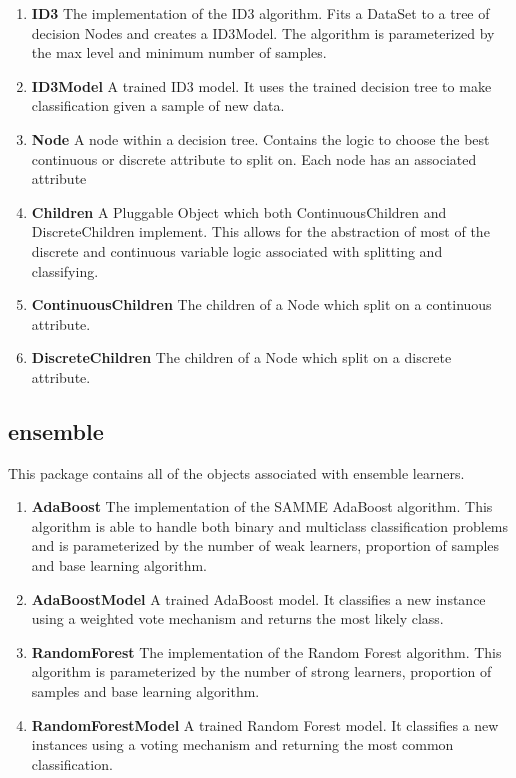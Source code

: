 \documentclass[11pt]{article}
\newcommand{\bb}{\textbf}
\begin{document}
\begin{enumerate}[leftmargin=*]
  \item[] \bb{ID3} The implementation of the ID3 algorithm. Fits a DataSet to a tree of decision Nodes and creates a ID3Model. The algorithm is parameterized by the max level and minimum number of samples.
  \item[] \bb{ID3Model} A trained ID3 model. It uses the trained decision tree to make classification given a sample of new data.
  \item[] \bb{Node} A node within a decision tree. Contains the logic to choose the best continuous or discrete attribute to split on. Each node has an associated attribute
  \item[] \bb{Children} A Pluggable Object which both ContinuousChildren and DiscreteChildren implement. This allows for the abstraction of most of the discrete and continuous variable logic associated with splitting and classifying.
  \item[] \bb{ContinuousChildren} The children of a Node which split on a continuous attribute.
  \item[] \bb{DiscreteChildren} The children of a Node which split on a discrete attribute.
\end{enumerate}

\subsection{ensemble}
This package contains all of the objects associated with ensemble learners.

\begin{enumerate}[leftmargin=*]
  \item[] \bb{AdaBoost} The implementation of the SAMME AdaBoost algorithm. This algorithm is able to handle both binary and multiclass classification problems and is parameterized by the number of weak learners, proportion of samples and base learning algorithm.
  \item[] \bb{AdaBoostModel} A trained AdaBoost model. It classifies a new instance using a weighted vote mechanism and returns the most likely class.
  \item[] \bb{RandomForest} The implementation of the Random Forest algorithm. This algorithm is parameterized by the number of strong learners, proportion of samples and base learning algorithm.
  \item[] \bb{RandomForestModel} A trained Random Forest model. It classifies a new instances using a voting mechanism and returning the most common classification.
\end{enumerate}
\end{document}

